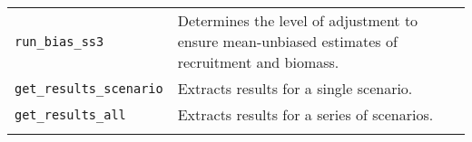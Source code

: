 \documentclass[11pt]{article}
\begin{document}
\begin{spacing}{1.2}
\begin{longtable}[c]{@{}ll@{}}
\begin{minipage}[t]{0.32\columnwidth}
\texttt{run\_bias\_ss3}
\end{minipage} & \begin{minipage}[t]{0.57\columnwidth}\raggedright
Determines the level of adjustment to ensure mean-unbiased estimates of
recruitment and biomass.
\end{minipage}
\\\noalign{\medskip}
\begin{minipage}[t]{0.32\columnwidth}\raggedright
\texttt{get\_results\_scenario}
\end{minipage} & \begin{minipage}[t]{0.57\columnwidth}\raggedright
Extracts results for a single scenario.
\end{minipage}
\\\noalign{\medskip}
\begin{minipage}[t]{0.32\columnwidth}\raggedright
\texttt{get\_results\_all}
\end{minipage} & \begin{minipage}[t]{0.57\columnwidth}\raggedright
Extracts results for a series of scenarios.
\end{minipage}
\\\noalign{\medskip}
\hline
\end{longtable}

%
%
%
% 

\end{spacing}
\end{document}

